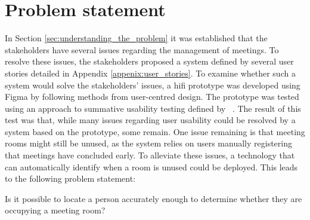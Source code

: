 \section{Problem statement}
In Section \ref{sec:understanding_the_problem} it was established that the stakeholders have several issues regarding the management of meetings. 
To resolve these issues, the stakeholders proposed a system defined by several user stories detailed in Appendix \ref{appenix:user_stories}. 
To examine whether such a system would solve the stakeholders' issues, a hifi prototype was developed using Figma\cite{Figma} by following methods from user-centred design.
The prototype was tested using an approach to summative usability testing defined by \citeauthor{lazar2005web}~\cite{lazar2005web}. 
The result of this test was that, while many issues regarding user usability could be resolved by a system based on the prototype, some remain. 
One issue remaining is that meeting rooms might still be unused, as the system relies on users manually registering that meetings have concluded early.
To alleviate these issues, a technology that can automatically identify when a room is unused could be deployed. This leads to the following problem statement:
\begin{problem_statement}
    Is it possible to locate a person accurately enough to determine whether they are occupying a meeting room?
\end{problem_statement}

